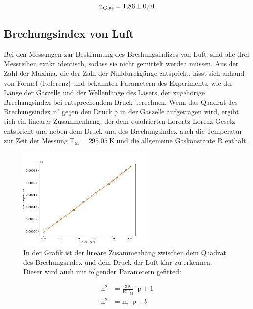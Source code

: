         \begin{equation}
            \text{n}_{\text{Glas}} = \num{1.86 +- 0.01}
        \end{equation}


    \subsection{Brechungsindex von Luft}
        Bei den Messungen zur Bestimmung des Brechungsindizes von Luft, sind alle drei Messreihen exakt identisch, sodass sie nicht gemittelt werden müssen. Aus der Zahl der Maxima, die der Zahl der 
        Nulldurchgänge entspricht, lässt sich anhand von Formel (Referenz) und bekannten Parametern des Experiments, wie der Länge der Gaszelle und der Wellenlänge des Lasers, der zugehörige Brechungsindex
        bei entsprechendem Druck berechnen. Wenn das Quadrat des Brechungsindex n² gegen den Druck p in der Gaszelle aufgetragen wird, ergibt sich ein linearer Zusammenhang, der dem quadrierten Lorentz-Lorenz-Gesetz entspricht und neben dem Druck und des Brechungsindex auch die Temperatur zur Zeit der Messung $\text{T}_{\text{M}}=\SI{295.05}{\kelvin}$ und die allgemeine Gaskonstante R enthält. 


        \FloatBarrier

        \begin{figure}[h]
          \centering
          \includegraphics[width = 0.6\textwidth]{pictures/druck_lin.pdf}
          \caption{In der Grafik ist der lineare Zusammenhang zwischen dem Quadrat des Brechungsindex und dem Druck der Luft klar zu erkennen. Dieser wird auch mit folgenden Parametern gefitted: }
          \label{fig:Aufbau}
        \end{figure}

        \FloatBarrier

        \begin{align}
            \text{n}^2 &= \frac{3\text{A}}{\text{RT}_{\text{M}}} \cdot \text{p} + 1 \\
            \text{n}^2 &= \text{m} \cdot \text{p} + b
        \end{align}

